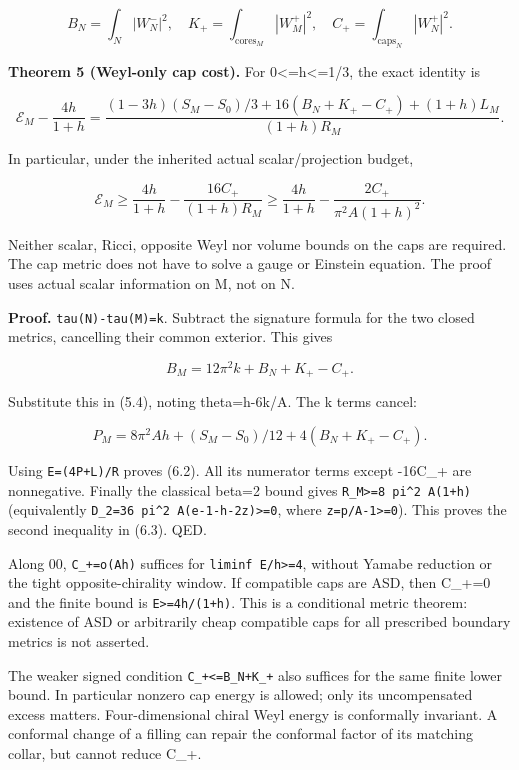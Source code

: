 \documentclass[
  10pt,
]{article}
\begin{document}
\[
 B_N=\int_N|W_N^-|^2,\quad
 K_+=\int_{\mathrm{cores}_M}|W_M^+|^2,\quad
 C_+=\int_{\mathrm{caps}_N}|W_N^+|^2.                 \tag{6.1}
\]

\textbf{Theorem 5 (Weyl-only cap cost).} For 0\textless=h\textless=1/3,
the exact identity is

\[
 \boxed{\mathcal E_M-\frac{4h}{1+h}
  =\frac{(1-3h)(S_M-S_0)/3+16(B_N+K_+-C_+)+(1+h)L_M}
                        {(1+h)R_M}.}                 \tag{6.2}
\]

In particular, under the inherited actual scalar/projection budget,

\[
 \boxed{\mathcal E_M\ge\frac{4h}{1+h}
       -\frac{16C_+}{(1+h)R_M}
       \ge\frac{4h}{1+h}-\frac{2C_+}{\pi^2 A(1+h)^2}.} \tag{6.3}
\]

Neither scalar, Ricci, opposite Weyl nor volume bounds on the caps are
required. The cap metric does not have to solve a gauge or Einstein
equation. The proof uses actual scalar information on M, not on N.

\textbf{Proof.} \texttt{tau(N)-tau(M)=k}. Subtract the signature formula
for the two closed metrics, cancelling their common exterior. This gives

\[
                 B_M=12\pi^2k+B_N+K_+-C_+.           \tag{6.4}
\]

Substitute this in (5.4), noting theta=h-6k/A. The k terms cancel:

\[
       P_M=8\pi^2Ah+(S_M-S_0)/12+4(B_N+K_+-C_+).
                                                        \tag{6.5}
\]

Using \texttt{E=(4P+L)/R} proves (6.2). All its numerator terms except
-16C\_+ are nonnegative. Finally the classical beta=2 bound gives
\texttt{R\_M\textgreater{}=8\ pi\^{}2\ A(1+h)} (equivalently
\texttt{D\_2=36\ pi\^{}2\ A(e-1-h-2z)\textgreater{}=0}, where
\texttt{z=p/A-1\textgreater{}=0}). This proves the second inequality in
(6.3). QED.

Along 00, \texttt{C\_+=o(Ah)} suffices for
\texttt{liminf\ E/h\textgreater{}=4}, without Yamabe reduction or the
tight opposite-chirality window. If compatible caps are ASD, then C\_+=0
and the finite bound is \texttt{E\textgreater{}=4h/(1+h)}. This is a
conditional metric theorem: existence of ASD or arbitrarily cheap
compatible caps for all prescribed boundary metrics is not asserted.

The weaker signed condition \texttt{C\_+\textless{}=B\_N+K\_+} also
suffices for the same finite lower bound. In particular nonzero cap
energy is allowed; only its uncompensated excess matters.
Four-dimensional chiral Weyl energy is conformally invariant. A
conformal change of a filling can repair the conformal factor of its
matching collar, but cannot reduce C\_+.
\end{document}
